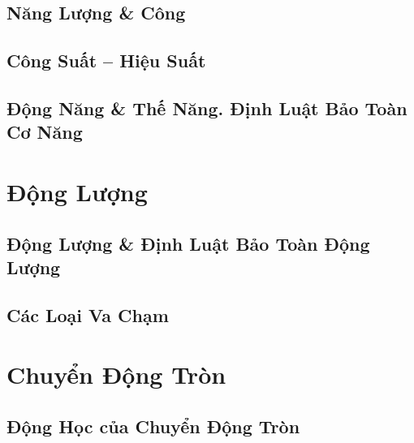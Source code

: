 \documentclass[oneside]{book}
\numberwithin{equation}{section}
\begin{document}
\section{Năng Lượng \& Công}


\section{Công Suất -- Hiệu Suất}


\section{Động Năng \& Thế Năng. Định Luật Bảo Toàn Cơ Năng}


\chapter{Động Lượng}

\section{Động Lượng \& Định Luật Bảo Toàn Động Lượng}


\section{Các Loại Va Chạm}


\chapter{Chuyển Động Tròn}

\section{Động Học của Chuyển Động Tròn}

\end{document}
